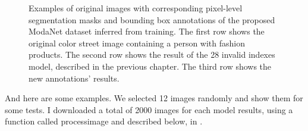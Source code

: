 \begin{figure}[H]
\begin{tabular}{cccccc}
	\end{tabular}
	\caption{Examples of original images with corresponding pixel-level segmentation masks and bounding box annotations of the proposed ModaNet dataset inferred from training. The first row shows the original color street image containing a person with fashion products. The second row shows the result of the 28 invalid indexes model, described in the previous chapter. The third row shows the new annotations' results.}
	\label{f:processedimages} %
\end{figure}

And here are some examples. We selected 12 images randomly and show them for some tests. I downloaded a total of 2000 images for each model results, using a function called processimage and described below, in .


